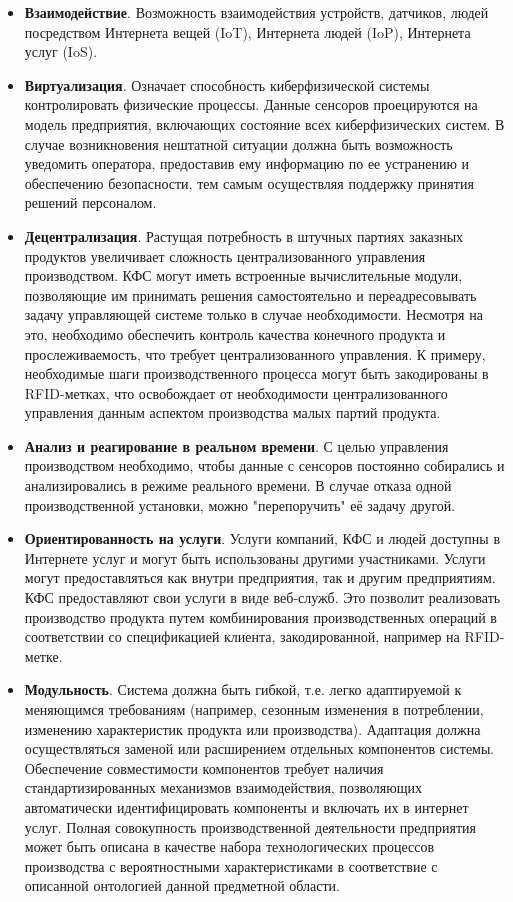 \begin{itemize}
\item \textbf{Взаимодействие}. Возможность взаимодействия устройств, датчиков, людей посредством Интернета вещей (IoT), Интернета людей (IoP), Интернета услуг (IoS).
\item \textbf{Виртуализация}. Означает способность киберфизической системы контролировать физические процессы. Данные сенсоров проецируются на модель предприятия, включающих состояние всех киберфизических систем. В случае возникновения нештатной ситуации должна быть возможность уведомить оператора, предоставив ему информацию по ее устранению и обеспечению безопасности, тем самым осуществляя поддержку принятия решений персоналом.
\item \textbf{Децентрализация}. Растущая потребность в штучных партиях заказных продуктов увеличивает сложность централизованного управления производством. КФС могут иметь встроенные вычислительные модули, позволяющие им принимать решения самостоятельно и переадресовывать задачу управляющей системе только в случае необходимости. Несмотря на это, необходимо обеспечить контроль качества конечного продукта и прослеживаемость, что требует централизованного управления. К примеру, необходимые шаги производственного процесса могут быть закодированы в RFID-метках, что освобождает от необходимости централизованного управления данным аспектом производства малых партий продукта.
\item \textbf{Анализ и реагирование в реальном времени}. С целью управления производством необходимо, чтобы данные с сенсоров постоянно собирались и анализировались в режиме реального времени. В случае отказа одной производственной установки, можно "перепоручить" её задачу другой.
\item \textbf{Ориентированность на услуги}. Услуги компаний, КФС и людей доступны в Интернете услуг и могут быть использованы другими участниками. Услуги могут предоставляться как внутри предприятия, так и другим предприятиям. КФС предоставляют свои услуги в виде веб-служб. Это позволит реализовать производство продукта путем комбинирования производственных операций в соответствии со спецификацией клиента, закодированной, например на RFID-метке.
\item \textbf{Модульность}. Система должна быть гибкой, т.е. легко адаптируемой к меняющимся требованиям (например, сезонным изменения в потреблении, изменению характеристик продукта или производства). Адаптация должна осуществляться заменой или расширением отдельных компонентов системы. Обеспечение совместимости компонентов требует наличия стандартизированных механизмов взаимодействия, позволяющих автоматически идентифицировать компоненты и включать их в интернет услуг.
Полная совокупность производственной деятельности предприятия может быть описана в качестве набора технологических процессов производства с вероятностными характеристиками в соответствие с описанной онтологией данной предметной области.
\end{itemize}

